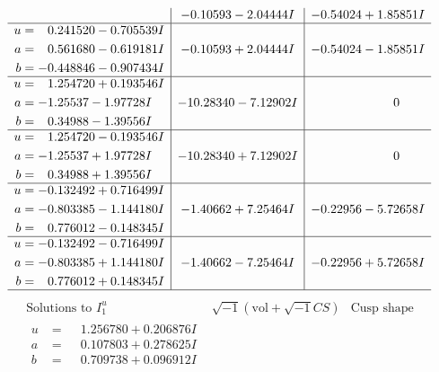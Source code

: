 \documentclass[1p]{elsarticle_modified}
\theoremstyle{definition}
\newcommand{\I}{\sqrt{-1}}
\begin{document}
$$\begin{array}{c|c|c}
 & -0.10593 - 2.04444 I & -0.54024 + 1.85851 I \\ \hline\begin{aligned}
u &= \phantom{-}0.241520 - 0.705539 I \\
a &= \phantom{-}0.561680 - 0.619181 I \\
b &= -0.448846 - 0.907434 I\end{aligned}
 & -0.10593 + 2.04444 I & -0.54024 - 1.85851 I \\ \hline\begin{aligned}
u &= \phantom{-}1.254720 + 0.193546 I \\
a &= -1.25537 - 1.97728 I \\
b &= \phantom{-}0.34988 - 1.39556 I\end{aligned}
 & -10.28340 - 7.12902 I & \phantom{-0.000000 } 0 \\ \hline\begin{aligned}
u &= \phantom{-}1.254720 - 0.193546 I \\
a &= -1.25537 + 1.97728 I \\
b &= \phantom{-}0.34988 + 1.39556 I\end{aligned}
 & -10.28340 + 7.12902 I & \phantom{-0.000000 } 0 \\ \hline\begin{aligned}
u &= -0.132492 + 0.716499 I \\
a &= -0.803385 - 1.144180 I \\
b &= \phantom{-}0.776012 - 0.148345 I\end{aligned}
 & -1.40662 + 7.25464 I & -0.22956 - 5.72658 I \\ \hline\begin{aligned}
u &= -0.132492 - 0.716499 I \\
a &= -0.803385 + 1.144180 I \\
b &= \phantom{-}0.776012 + 0.148345 I\end{aligned}
 & -1.40662 - 7.25464 I & -0.22956 + 5.72658 I\\
 \hline 
 \end{array}$$\newpage$$\begin{array}{c|c|c}  
\text{Solutions to }I^u_{1}& \I (\text{vol} + \sqrt{-1}CS) & \text{Cusp shape}\\
 \hline 
\begin{aligned}
u &= \phantom{-}1.256780 + 0.206876 I \\
a &= \phantom{-}0.107803 + 0.278625 I \\
b &= \phantom{-}0.709738 + 0.096912 I\end{aligned}

\end{array}$$
\end{document}
